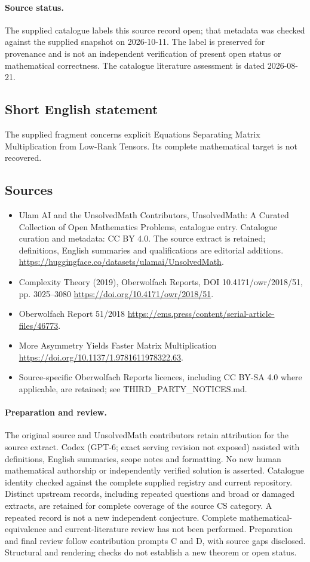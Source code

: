 \documentclass[11pt]{article}
\begin{document}
\paragraph{Source status.}
The supplied catalogue labels this source record open; that metadata was checked against the supplied snapshot on 2026-10-11. The label is preserved for provenance and is not an independent verification of present open status or mathematical correctness. The catalogue literature assessment is dated 2026-08-21.
\subsection{Short English statement}
The supplied fragment concerns explicit Equations Separating Matrix Multiplication from Low-Rank Tensors. Its complete mathematical target is not recovered.
\subsection{Sources}
\begin{itemize}
\item[\hypertarget{source:statement:1}{S1}] Ulam AI and the UnsolvedMath Contributors, UnsolvedMath: A Curated Collection of Open Mathematics Problems, catalogue entry. Catalogue curation and metadata: CC BY 4.0. The source extract is retained; definitions, English summaries and qualifications are editorial additions.
\url{https://huggingface.co/datasets/ulamai/UnsolvedMath}.
\item[\hypertarget{source:statement:2}{S2}] Complexity Theory (2019), Oberwolfach Reports, DOI 10.4171/owr/2018/51, pp. 3025--3080
\url{https://doi.org/10.4171/owr/2018/51}.
\item[\hypertarget{source:statement:3}{S3}] Oberwolfach Report 51/2018
\url{https://ems.press/content/serial-article-files/46773}.
\item[\hypertarget{source:statement:4}{S4}] More Asymmetry Yields Faster Matrix Multiplication
\url{https://doi.org/10.1137/1.9781611978322.63}.
\item Source-specific Oberwolfach Reports licences, including CC BY-SA 4.0 where applicable, are retained; see THIRD\_PARTY\_NOTICES.md.
\end{itemize}
\paragraph{Preparation and review.}
The original source and UnsolvedMath contributors retain attribution for the source extract. Codex (GPT-6; exact serving revision not exposed) assisted with definitions, English summaries, scope notes and formatting. No new human mathematical authorship or independently verified solution is asserted. Catalogue identity checked against the complete supplied registry and current repository. Distinct upstream records, including repeated questions and broad or damaged extracts, are retained for complete coverage of the source CS category. A repeated record is not a new independent conjecture. Complete mathematical-equivalence and current-literature review has not been performed. Preparation and final review follow contribution prompts C and D, with source gaps disclosed. Structural and rendering checks do not establish a new theorem or open status.
\label{end:statement}
\end{document}
